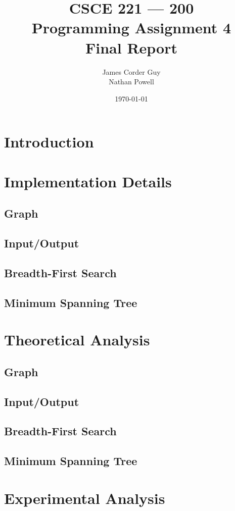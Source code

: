 \documentclass[titlepage]{article}
\title{
	\textbf{
		CSCE 221 --- 200 \\
		Programming Assignment 4 \\
		Final Report
	}
}
\author{
	James Corder Guy \\
	Nathan Powell
}
\date{
	\today
}
\begin{document}
	\maketitle
	\begin{multicols}{2}
		\section{Introduction}
		\section{Implementation Details}
			\subsection{Graph}
			\subsection{Input/Output}
			\subsection{Breadth-First Search}
			\subsection{Minimum Spanning Tree}

		\section{Theoretical Analysis}
			\subsection{Graph}
			\subsection{Input/Output}
			\subsection{Breadth-First Search}
			\subsection{Minimum Spanning Tree}

		\section{Experimental Analysis}

\end{multicols}
\end{document}
